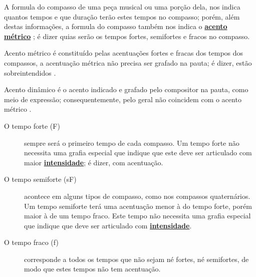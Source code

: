 A formula do compasso de uma peça musical ou uma porção dela, 
nos indica quantos tempos e que duração terão estes tempos no compasso; 
porém, além destas informações, 
a formula do compasso também nos indica o \hyperref[def:acentometrico]{\textbf{acento métrico}} \cite[pp. 70]{cardoso1973curso}; 
é dizer quias serão os tempos fortes, semifortes e fracos no compasso.

\begin{tcbinformation}{Acento métrico}
\label{def:acentometrico} 
é constituído pelas acentuações fortes e fracas dos tempos dos compassos, 
a acentuação métrica não precisa ser grafado na pauta;
é dizer, estão sobreintendidos \cite[pp. 141,217]{medteoria}.
\end{tcbinformation} 

\begin{tcbinformation}{Acento dinâmico}
\label{def:acentodinamico}
 é o acento indicado e grafado pelo compositor na pauta, como meio de expressão;
consequentemente, pelo geral não coincidem com o acento métrico \cite[pp. 217]{medteoria}.
\end{tcbinformation} 



\begin{description}

\item[O tempo forte (F)] 
\label{def:tempoforte} 
sempre será o primeiro tempo de cada compasso. 
Um tempo forte não necessita uma grafia especial que indique que este deve ser articulado
com maior \hyperref[sec:pos:Intensidade]{\textbf{intensidade}}; é dizer, com acentuação.

\item[O tempo semiforte (sF)] 
\label{def:temposemiforte} 
acontece em alguns tipos de compasso, 
como nos compassos quaternários. 
Um tempo semiforte terá uma acentuação menor à do tempo forte, porém maior à de um tempo fraco. 
Este tempo não necessita uma grafia especial que indique que deve ser articulado
com \hyperref[sec:pos:Intensidade]{\textbf{intensidade}}.

\item[O tempo fraco (f)] 
\label{def:tempofraco} 
corresponde a todos os tempos que não sejam né fortes, né semifortes,
de modo que estes tempos não tem acentuação. 
\end{description}~

